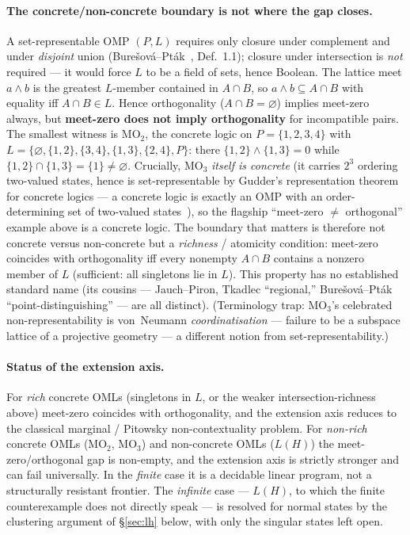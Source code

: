 \documentclass[11pt]{article}
\theoremstyle{definition}
\begin{document}
\paragraph{The concrete/non-concrete boundary is not where the gap
closes.}
A set-representable OMP $(P, L)$ requires only closure under
complement and under \emph{disjoint} union
(Bure\v{s}ov\'{a}--Pt\'{a}k~\cite{BuresovaPtak2024}, Def.~1.1);
closure under intersection is \emph{not} required --- it would force
$L$ to be a field of sets, hence Boolean.  The lattice meet $a \wedge
b$ is the greatest $L$-member contained in $A \cap B$, so $a \wedge b
\subseteq A \cap B$ with equality iff $A \cap B \in L$.  Hence
orthogonality ($A \cap B = \varnothing$) implies meet-zero always, but
\textbf{meet-zero does not imply orthogonality} for incompatible
pairs.  The smallest witness is $\mathrm{MO}_2$, the concrete logic on
$P = \{1,2,3,4\}$ with
$L = \{\varnothing, \{1,2\}, \{3,4\}, \{1,3\}, \{2,4\}, P\}$: there
$\{1,2\} \wedge \{1,3\} = 0$ while $\{1,2\} \cap \{1,3\} = \{1\} \neq
\varnothing$.  Crucially, $\mathrm{MO}_3$ \emph{itself is concrete}
(it carries $2^3$ ordering two-valued states, hence is
set-representable by Gudder's representation theorem for concrete
logics --- a concrete logic is exactly an OMP with an order-determining
set of two-valued states~\cite{PtakPulmannova1991}), so the flagship ``meet-zero $\neq$ orthogonal'' example above
is a concrete logic.  The boundary that matters is therefore not
concrete versus non-concrete but a \emph{richness} / atomicity
condition: meet-zero coincides with orthogonality iff every nonempty
$A \cap B$ contains a nonzero member of $L$ (sufficient: all singletons
lie in $L$).  This property has no established standard name (its
cousins --- Jauch--Piron, Tkadlec ``regional,''
Bure\v{s}ov\'{a}--Pt\'{a}k ``point-distinguishing'' --- are all
distinct).  (Terminology trap: $\mathrm{MO}_3$'s celebrated
non-representability is von~Neumann \emph{coordinatisation} --- failure
to be a subspace lattice of a projective geometry --- a different
notion from set-representability.)

\paragraph{Status of the extension axis.}
For \emph{rich} concrete OMLs (singletons in $L$, or the weaker
intersection-richness above) meet-zero coincides with orthogonality,
and the extension axis reduces to the classical marginal /
Pitowsky non-contextuality problem.  For \emph{non-rich} concrete OMLs
($\mathrm{MO}_2$, $\mathrm{MO}_3$) and non-concrete OMLs ($L(H)$) the
meet-zero/orthogonal gap is non-empty, and the extension axis is
strictly stronger and can fail universally.  In the \emph{finite} case
it is a decidable linear program, not a structurally resistant
frontier.  The \emph{infinite} case --- $L(H)$, to which the finite
counterexample does not directly speak --- is resolved for normal
states by the clustering argument of \S\ref{sec:lh} below, with only
the singular states left open.
\end{document}
